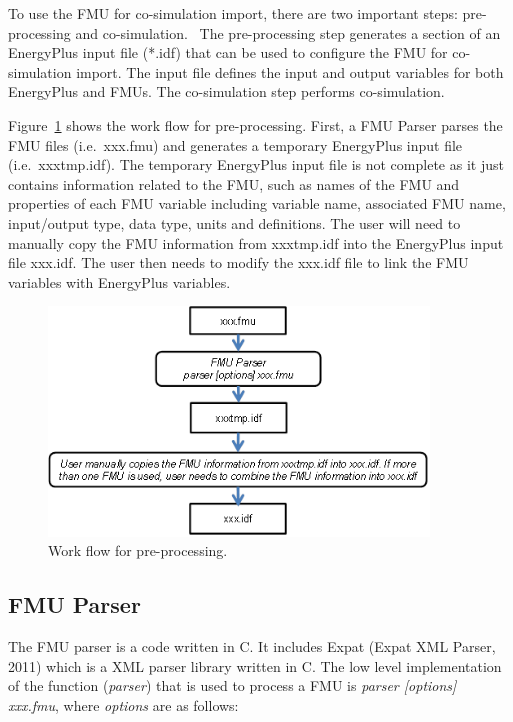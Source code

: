 To use the FMU for co-simulation import, there are two important steps: pre-processing and co-simulation.~ The pre-processing step generates a section of an EnergyPlus input file (*.idf) that can be used to configure the FMU for co-simulation import. The input file defines the input and output variables for both EnergyPlus and FMUs. The co-simulation step performs co-simulation.

Figure~\ref{fig:work-flow-for-pre-processing.} shows the work flow for pre-processing. First, a FMU Parser parses the FMU files (i.e.~xxx.fmu) and generates a temporary EnergyPlus input file (i.e.~xxxtmp.idf). The temporary EnergyPlus input file is not complete as it just contains information related to the FMU, such as names of the FMU and properties of each FMU variable including variable name, associated FMU name, input/output type, data type, units and definitions. The user will need to manually copy the FMU information from xxxtmp.idf into the EnergyPlus input file xxx.idf. The user then needs to modify the xxx.idf file to link the FMU variables with EnergyPlus variables.

\begin{figure}[hbtp] %
\centering
\includegraphics[width=0.9\textwidth, height=0.9\textheight, keepaspectratio=true]{media/image036.png}
\caption{Work flow for pre-processing. \protect \label{fig:work-flow-for-pre-processing.}}
\end{figure}

\subsection{FMU Parser}\label{fmu-parser}

The FMU parser is a code written in C. It includes Expat (Expat XML Parser, 2011) which is a XML parser library written in C. The low level implementation of the function (\emph{parser}) that is used to process a FMU is \emph{parser {[}options{]} xxx.fmu}, where \emph{options} are as follows:

